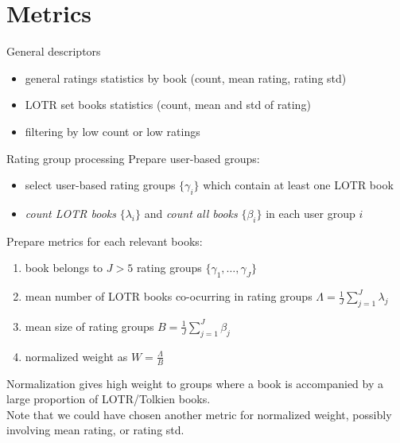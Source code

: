 \documentclass[9pt]{beamer}
\begin{document}
\section{Metrics}

\begin{frame}{General descriptors}
	\begin{itemize}
		\item general ratings statistics by book (count, mean rating, rating std)
		\item LOTR set books statistics (count, mean and std of rating)
		\item filtering by low count or low ratings
	\end{itemize}
\end{frame}

\begin{frame}{Rating group processing}
	Prepare user-based groups:\\
	\begin{itemize}
		\item select user-based rating groups $\{\gamma_i\}$ which contain at least one LOTR book
		\item \emph{count LOTR books} $\{\lambda_i\}$ and \emph{count all books} $\{\beta_i\}$ in each user group $i$ 
	\end{itemize}
	Prepare metrics for each relevant books:\\
	\begin{enumerate}
		\item book belongs to $J>5$ rating groups $\{\gamma_1,\ldots,\gamma_J\}$ 
		\item mean number of LOTR books co-ocurring in rating groups $\Lambda =\frac{1}{J}\sum_{j=1}^{J} \lambda_j $
		\item mean size of rating groups $B = \frac{1}{J}\sum_{j=1}^J \beta_j$
		\item normalized weight as $W = \frac{\Lambda}{B}$
	\end{enumerate}
	Normalization gives high weight to groups where a book is accompanied by a large proportion of LOTR/Tolkien books.\\
	Note that we could have chosen another metric for normalized weight, possibly involving mean rating, or rating std.
\end{frame}
\end{document}
